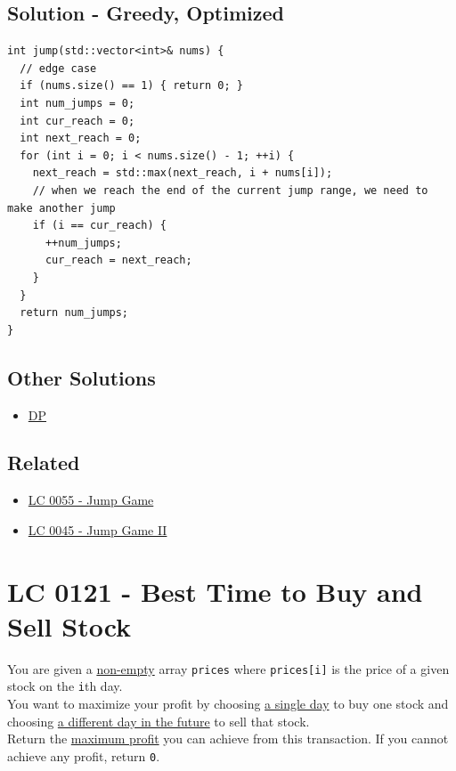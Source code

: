 \subsection*{Solution - Greedy, Optimized}
\begin{lstlisting}
int jump(std::vector<int>& nums) {
  // edge case
  if (nums.size() == 1) { return 0; }
  int num_jumps = 0;
  int cur_reach = 0;
  int next_reach = 0;
  for (int i = 0; i < nums.size() - 1; ++i) {
    next_reach = std::max(next_reach, i + nums[i]);
    // when we reach the end of the current jump range, we need to make another jump
    if (i == cur_reach) {
      ++num_jumps;
      cur_reach = next_reach;
    }
  }
  return num_jumps;
}
\end{lstlisting}

\subsection*{Other Solutions}
\begin{itemize}
	\item \hyperref[solution:lc0045_dp]{DP}
\end{itemize}

\subsection*{Related}
\begin{itemize}
	\item \hyperref[lc0055]{LC 0055 - Jump Game}
	\item \hyperref[lc0045]{LC 0045 - Jump Game II}
\end{itemize}

\section{LC 0121 - Best Time to Buy and Sell Stock}\label{lc0121}
You are given a \ul{non-empty} array {\colorbox{CodeBackground}{\lstinline|prices|}} where {\colorbox{CodeBackground}{\lstinline|prices[i]|}} is the price of a given stock on the {\colorbox{CodeBackground}{\lstinline|i|}}th day.\\

You want to maximize your profit by choosing \ul{a single day} to buy one stock and choosing \ul{a different day in the future} to sell that stock.\\

Return the \ul{maximum profit} you can achieve from this transaction. If you cannot achieve any profit, return {\colorbox{CodeBackground}{\lstinline|0|}}.\\

